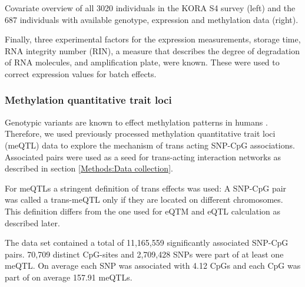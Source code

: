 \documentclass[a4paper,12pt,twoside,openright]{article}
\begin{document}
\begin{table}[h!]
  	\begin{minipage}{.5\textwidth}
    \end{minipage}
     \begin{minipage}{.5\linewidth}
    \end{minipage}%
    \caption{Covariate overview of all 3020 individuals in the KORA S4 survey (left) and the 687 individuals with available genotype, expression and methylation data (right).}
	\label{tab:covariate.overview}
\end{table}

Finally, three experimental factors for the expression measurements, storage time, RNA integrity number (RIN), a measure that describes the degree of degradation of RNA molecules\cite{Schroeder2006}, and amplification plate, were known. These were used to correct expression values for batch effects. 

\subsubsection{Methylation quantitative trait loci}
\label{Data:meQTL}
Genotypic variants are known to effect methylation patterns in humans \cite{Jones2013}. Therefore, we used previously processed methylation quantitative trait loci (meQTL) data to explore the mechanism of trans acting SNP-CpG associations. Associated pairs were used as a seed for trans-acting interaction networks as described in section \ref{Methods:Data collection}.

For meQTLs a stringent definition of trans effects was used: A SNP-CpG pair was called a trans-meQTL only if they are located on different chromosomes. This definition differs from the one used for eQTM and eQTL calculation as described later. 

The data set contained a total of 11,165,559 significantly associated SNP-CpG pairs. 
70,709 distinct CpG-sites and 2,709,428 SNPs were part of at least one meQTL. On average each SNP was associated with 4.12 CpGs and each CpG was part of on average 157.91 meQTLs.
\end{document}

